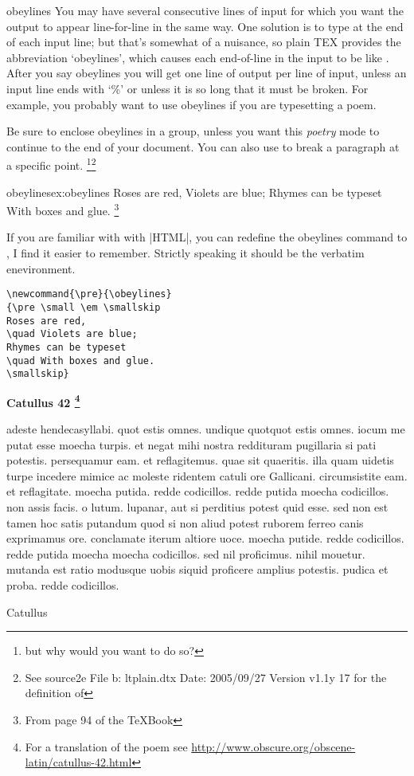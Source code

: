 \begin{docCommand}{obeylines}{}
You may have several consecutive lines of input for which you want the output
to appear line-for-line in the same way. One solution is to type  at the
end of each input line; but that's somewhat of a nuisance, so plain TEX provides the
abbreviation `obeylines', which causes each end-of-line in the input to be like .
After you say obeylines you will get one line of output per line of input, unless an
input line ends with `\%' or unless it is so long that it must be broken. For example, you
probably want to use obeylines if you are typesetting a poem. 
\end{docCommand}

Be sure to enclose
obeylines in a group, unless you want this \textit{poetry} mode to continue to the end of
your document.  You can also use  to break a paragraph at a specific point.  \footnote{but why would you want to do so?}\footnote{See source2e File b: ltplain.dtx Date: 2005/09/27 Version v1.1y 17 for the definition of }

\begin{texexample}{obeylines}{ex:obeylines}
\obeylines
Roses are red, 
\quad Violets are blue; 
Rhymes can be typeset
\quad With boxes and glue. \footnote{From page 94 of the TeXBook} 

\end{texexample}

If you are familiar with with |HTML|, you can redefine the obeylines command to , I find it easier to remember. Strictly speaking it should be the verbatim enevironment.

{\small
\begin{verbatim}
\newcommand{\pre}{\obeylines}
{\pre \small \em \smallskip
Roses are red,
\quad Violets are blue;
Rhymes can be typeset
\quad With boxes and glue.
\smallskip}
\end{verbatim}
}



{\obeylines
{\Large\bf  Catullus 42 \footnote{For a translation of the poem see \url{http://www.obscure.org/obscene-latin/catullus-42.html}}}

adeste hendecasyllabi. quot estis 
omnes. undique quotquot estis omnes. 
iocum me putat esse moecha turpis. 
et negat mihi nostra reddituram 
pugillaria si pati potestis. 
persequamur eam. et reflagitemus. 
quae sit quaeritis. illa quam uidetis 
turpe incedere mimice ac moleste 
ridentem catuli ore Gallicani. 
circumsistite eam. et reflagitate. 
moecha putida. redde codicillos. 
redde putida moecha codicillos. 
non assis facis. o lutum. lupanar, 
aut si perditius potest quid esse. 
sed non est tamen hoc satis putandum 
quod si non aliud potest ruborem 
ferreo canis exprimamus ore. 
conclamate iterum altiore uoce. 
moecha putide. redde codicillos. 
redde putida moecha moecha codicillos. 
sed nil proficimus. nihil mouetur. 
mutanda est ratio modusque uobis 
siquid proficere amplius potestis. 
pudica et proba. redde codicillos.


\hfil Catullus\par}


